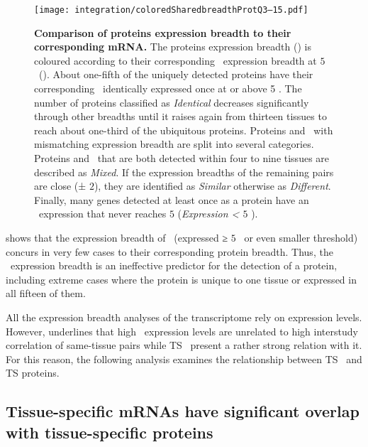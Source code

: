 \begin{figure}[!htpb]
    \texttt{[image: integration/coloredSharedbreadthProtQ3--15.pdf]}\centering
    \vspace{-4mm}
    \caption[Comparison of proteins expression breadth to
    corresponding mRNA breadth]{\label{fig:SharedBreadthProtQ3}%
    \textbf{Comparison of proteins expression breadth to their corresponding mRNA.}
    The proteins expression breadth ()
    is coloured according to
    their corresponding \mRNA\ expression breadth at $5$ \FPKM\
    ().
    About one-fifth of the uniquely detected proteins have
    their corresponding \mRNA\ identically expressed once at or above 5 \FPKM{}.
    The number of proteins classified as \emph{Identical} decreases significantly
    through other breadths until it raises again from thirteen tissues
    to reach about one-third of the ubiquitous proteins.
    Proteins and \mRNAs\ with mismatching expression breadth are split into
    several categories.
    Proteins and \mRNAs\ that are both detected within four to nine tissues
    are described as \emph{Mixed}.
    If the expression breadths of the remaining pairs are close (± $2$),
    they are identified as \emph{Similar} otherwise as \emph{Different}.
    Finally, many genes detected at least once as a protein have
    an \mRNA\ expression that never reaches $5$ \FPKM{} (\emph{Expression < $5$ \FPKM}).
    }
\end{figure}

 shows that the expression breadth
of \mRNAs\ (expressed ≥ $5$ \FPKM\ or even smaller threshold) concurs
in very few cases to their corresponding protein breadth.
Thus, the \mRNAs\ expression breadth is
an ineffective predictor for the detection of a protein,
including extreme cases where the protein is unique to one tissue
or expressed in all fifteen of them.

All the expression breadth analyses of the transcriptome rely on expression levels.
However, \Cref{ch:Transcriptomics} underlines that
high \mRNA\ expression levels are unrelated
to high interstudy correlation of same-tissue pairs
while \gls{TS} \mRNAs\ present a rather strong relation with it.
For this reason, the following analysis examines
the relationship between \gls{TS} \mRNAs\ and \gls{TS} proteins.


\subsection{Tissue-specific \texorpdfstring{\MakeLowercase{m}RNAs}{mRNAs} %
have significant overlap with tissue-specific proteins}\label{sec:TSprotMrna}

